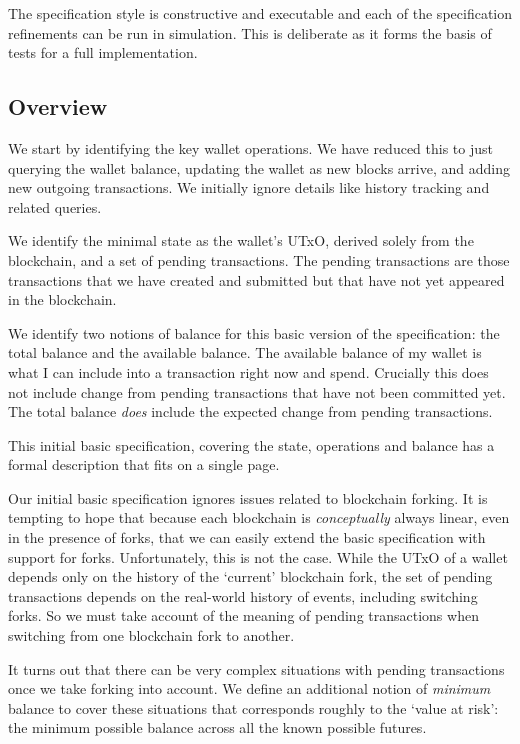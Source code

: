 \documentclass{article}
\theoremstyle{definition}{
  \newtheorem{lemma}{Lemma}[section] %
  \newtheorem{definition}[lemma]{Definition}
}
\theoremstyle{theorem}{
  \newtheorem{invariant}[lemma]{Invariant}
  \newtheorem{proofobligation}[lemma]{Proof Obligation}
}
\numberwithin{equation}{lemma}
\begin{document}
The specification style is constructive and executable and each of the
specification refinements can be run in simulation. This is deliberate as
it forms the basis of tests for a full implementation.

\subsection{Overview}

We start by identifying the key wallet operations. We have reduced this to
just querying the wallet balance, updating the wallet as new blocks arrive, and adding
new outgoing transactions. We initially ignore details like history tracking
and related queries.

We identify the minimal state as the wallet's UTxO, derived solely from the
blockchain, and a set of pending transactions. The pending transactions are
those transactions that we have created and submitted but that have not yet
appeared in the blockchain.

We identify two notions of balance for this basic version of the specification:
the total balance and the available balance. The available balance of my wallet
is what I can include into a transaction right now and spend. Crucially this
does not include change from pending transactions that have not been committed
yet. The total balance \emph{does} include the expected change from pending
transactions.

This initial basic specification, covering the state, operations and balance
has a formal description that fits on a single page.

Our initial basic specification ignores issues related to blockchain forking.
It is tempting to hope that because each blockchain is \emph{conceptually}
always linear, even in the presence of forks, that we can easily extend the
basic specification with support for forks. Unfortunately, this is not the
case. While the UTxO of a wallet depends only on the history of the `current'
blockchain fork, the set of pending transactions depends on the real-world
history of events, including switching forks. So we must take account of the
meaning of pending transactions when switching from one blockchain fork to
another.

It turns out that there can be very complex situations with pending transactions
once we take forking into account. We define an additional notion of
\emph{minimum} balance to cover these situations that corresponds roughly to
the `value at risk': the minimum possible balance across all the known possible
futures.
\end{document}
